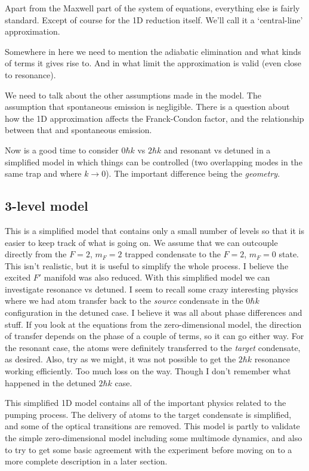 Apart from the Maxwell part of the system of equations, everything else is fairly standard.  Except of course for the 1D reduction itself.  We'll call it a `central-line' approximation.

Somewhere in here we need to mention the adiabatic elimination and what kinds of terms it gives rise to.  And in what limit the approximation is valid (even close to resonance).

We need to talk about the other assumptions made in the model.  The assumption that spontaneous emission is negligible.  There is a question about how the 1D approximation affects the Franck-Condon factor, and the relationship between that and spontaneous emission.

Now is a good time to consider $0 \hbar k$ vs $2 \hbar k$ and resonant vs detuned in a simplified model in which things can be controlled (two overlapping modes in the same trap and where $k \rightarrow 0$). The important difference being the \emph{geometry}.

\subsection{3-level model}

This is a simplified model that contains only a small number of levels so that it is easier to keep track of what is going on.  We assume that we can outcouple directly from the $F=2$, $m_F=2$ trapped condensate to the $F=2$, $m_F=0$ state. This isn't realistic, but it is useful to simplify the whole process.  I believe the excited $F'$ manifold was also reduced.  With this simplified model we can investigate resonance vs detuned.  I seem to recall some crazy interesting physics where we had atom transfer back to the \emph{source} condensate in the $0 \hbar k$ configuration in the detuned case.  I believe it was all about phase differences and stuff.  If you look at the equations from the zero-dimensional model, the direction of transfer depends on the phase of a couple of terms, so it can go either way.  For the resonant case, the atoms were definitely transferred to the \emph{target} condensate, as desired.  Also, try as we might, it was not possible to get the $2 \hbar k$ resonance working efficiently.  Too much loss on the way.  Though I don't remember what happened in the detuned $2 \hbar k$ case.

This simplified 1D model contains all of the important physics related to the pumping process.  The delivery of atoms to the target condensate is simplified, and some of the optical transitions are removed.  This model is partly to validate the simple zero-dimensional model including some multimode dynamics, and also to try to get some basic agreement with the experiment before moving on to a more complete description in a later section.

